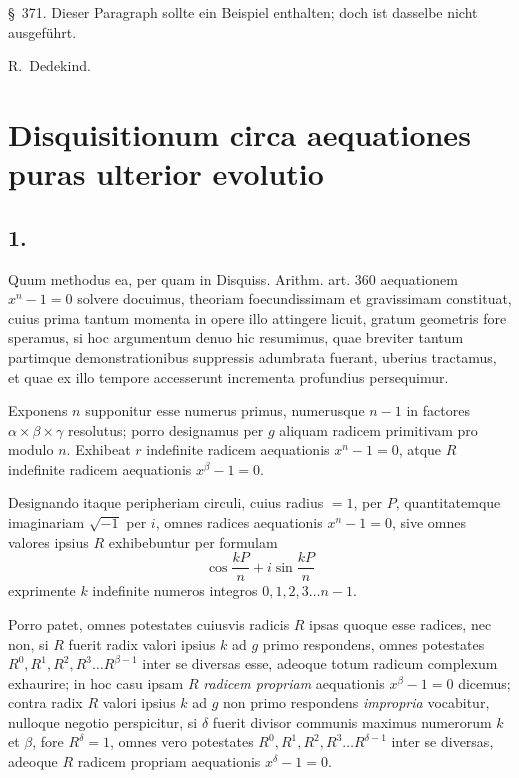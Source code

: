 \documentclass[12pt,a4paper]{article}
\begin{document}
\S\ 371. Dieser Paragraph sollte ein Beispiel enthalten; doch ist dasselbe nicht ausgef\"uhrt.

\begin{flushright}
R.~Dedekind.
\end{flushright}


\section*{Disquisitionum circa aequationes puras ulterior evolutio}

\subsection*{1.}

Quum methodus ea, per quam in Disquiss. Arithm. art. 360 aequationem $x^n-1=0$ solvere docuimus, theoriam foecundissimam et gravissimam constituat, cuius prima tantum momenta in opere illo attingere licuit, gratum geometris fore speramus, si hoc argumentum denuo hic resumimus, quae breviter tantum partimque demonstrationibus suppressis adumbrata fuerant, uberius tractamus, et quae ex illo tempore accesserunt incrementa profundius persequimur.

Exponens $n$ supponitur esse numerus primus, numerusque $n-1$ in factores $\alpha\times\beta\times\gamma$ resolutus; porro designamus per $g$ aliquam radicem primitivam pro modulo $n$. Exhibeat $r$ indefinite radicem aequationis $x^n-1=0$, atque $R$ indefinite radicem aequationis $x^\beta-1=0$.

Designando itaque peripheriam circuli, cuius radius $=1$, per $P$, quantitatemque imaginariam $\sqrt{-1}$ per $i$, omnes radices aequationis $x^n-1=0$, sive omnes valores ipsius $R$ exhibebuntur per formulam
\[
\cos\frac{kP}{n} + i\sin\frac{kP}{n}
\]
exprimente $k$ indefinite numeros integros $0, 1, 2, 3\ldots n-1$.

Porro patet, omnes potestates cuiusvis radicis $R$ ipsas quoque esse radices, nec non, si $R$ fuerit radix valori ipsius $k$ ad $g$ primo respondens, omnes potestates $R^0, R^1, R^2, R^3\ldots R^{\beta-1}$ inter se diversas esse, adeoque totum radicum complexum exhaurire; in hoc casu ipsam $R$ \textit{radicem propriam} aequationis $x^\beta-1=0$ dicemus; contra radix $R$ valori ipsius $k$ ad $g$ non primo respondens \textit{impropria} vocabitur, nulloque negotio perspicitur, si $\delta$ fuerit divisor communis maximus numerorum $k$ et $\beta$, fore $R^\delta=1$, omnes vero potestates $R^0, R^1, R^2, R^3\ldots R^{\delta-1}$ inter se diversas, adeoque $R$ radicem propriam aequationis $x^\delta-1=0$.
\end{document}
